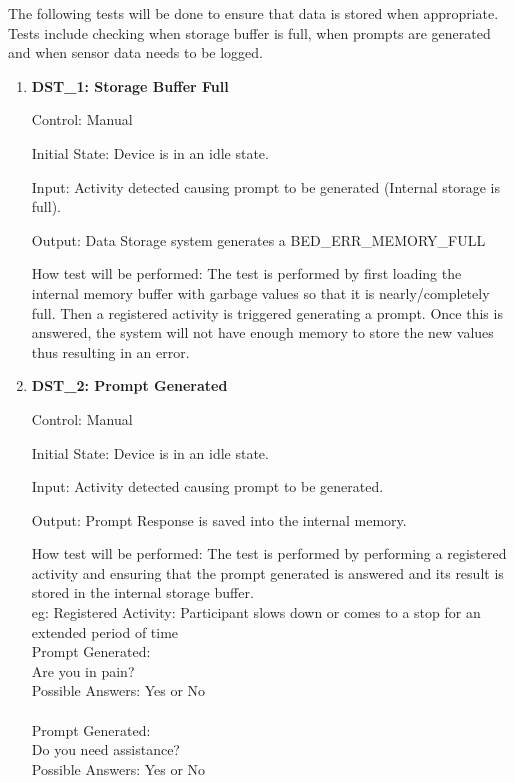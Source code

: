 \documentclass[12pt, titlepage]{article}
\begin{document}
The following tests will be done to ensure that data is stored when appropriate. Tests include checking when storage buffer is full, when prompts are generated and when sensor data needs to be logged. 
\begin{enumerate}
	\item{\textbf{DST\_1: Storage Buffer Full} \\}\label{DST1}
	
		Control: Manual 
							
		Initial State: Device is in an idle state.
							
		Input: Activity detected causing prompt to be generated (Internal storage is full).
		
		Output: Data Storage system generates a BED\_ERR\_MEMORY\_FULL
		
		How test will be performed: The test is performed by first loading the internal memory buffer with garbage values so that it is nearly/completely full. Then a registered activity is triggered generating a 					prompt. Once this is answered, the system will not have enough memory to store the new values thus resulting in an error.

	\item{\textbf{DST\_2: Prompt Generated} \\}\label{DST2}
	
		Control: Manual 
							
		Initial State: Device is in an idle state.
							
		Input: Activity detected causing prompt to be generated.
		
		Output: Prompt Response is saved into the internal memory.
		
		How test will be performed: The test is performed by performing a registered activity and ensuring that the prompt generated is answered and its result is stored in the internal storage buffer.\\
		eg: Registered Activity: Participant slows down or comes to a stop for an extended period of time\\
		Prompt Generated: \\
		Are you in pain?\\
		Possible Answers: Yes or No\\
		\\
		Prompt Generated: \\
		Do you need assistance?\\
		Possible Answers: Yes or No\\


\end{enumerate}
\end{document}
